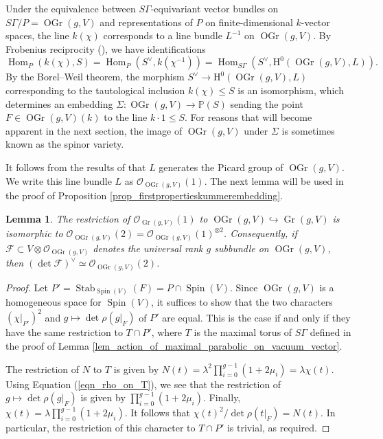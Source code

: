 \documentclass{article} %
\newtheorem{lemma}[proposition]{Lemma}
\numberwithin{equation}{section}
\DeclareMathOperator{\Spin}{Spin}
\DeclareMathOperator{\Hom}{Hom}
\DeclareMathOperator{\Stab}{Stab}
\newcommand{\sh}[1]{\mathscr{#1}}
\renewcommand{\P}{\mathbb{P}}
\renewcommand{\O}{\mathcal{O}}
\newcommand{\HH}{\mathrm{H}}
\DeclareMathOperator{\OGr}{OGr}
\DeclareMathOperator{\Gr}{Gr}
\begin{document}
Under the equivalence between $S \Gamma$-equivariant vector bundles on $S \Gamma / P = \OGr(g, V)$ and representations of $P$ on finite-dimensional $k$-vector spaces, the line $k(\chi)$ corresponds to a line bundle $L^{-1}$ on $\OGr(g, V)$. By Frobenius reciprocity (\cite[I.3.3, Proposition]{Jan03}), we have identifications
\[ \Hom_P(k(\chi), S) = \Hom_P(S^\vee, k(\chi^{-1})) = \Hom_{S \Gamma}(S^\vee, \HH^0(\OGr(g, V), L)). \]
By the Borel--Weil theorem, the morphism $S^\vee \rightarrow  \HH^0(\OGr(g, V), L)$ corresponding to the tautological inclusion $k(\chi) \leq S$ is an isomorphism, which determines an embedding $\Sigma : \OGr(g, V) \to \P(S)$ sending the point $F \in \OGr(g, V)(k)$ to the line $k \cdot 1 \leq S$. For reasons that will become apparent in the next section, the image of $\OGr(g, V)$ under $\Sigma$ is sometimes known as the spinor variety. 

It follows from the results of \cite{Pop74} that $L$ generates the Picard group of $\OGr(g,V)$.
We write this line bundle $L$ as $\mathcal{O}_{\OGr(g,V)}(1)$.
The next lemma will be used in the proof of Proposition \ref{prop_firstpropertieskummerembedding}. 
\begin{lemma}\label{lemma_spinorembedding_squareroot_plucker}
    The restriction of $\O_{\Gr(g,V)}(1)$ to $\OGr(g,V)\hookrightarrow \Gr(g,V)$ is isomorphic to $\O_{\OGr(g,V)}(2) = \O_{\OGr(g,V)}(1)^{\otimes 2}$.
    Consequently, if $\sh{F}\subset V\otimes\O_{\OGr(g,V)}$ denotes the universal rank $g$ subbundle on $\OGr(g,V)$, then $(\det \sh{F})^{\vee} \simeq \O_{\OGr(g,V)}(2)$.
\end{lemma}
\begin{proof}
    Let $P' = \Stab_{\Spin(V)}(F) = P \cap \Spin(V)$. Since $\OGr(g, V)$ is a homogeneous space for $\Spin(V)$, it suffices to show that the two characters $(\chi|_{P'})^{2}$ and $g \mapsto \det \rho(g|_F)$ of $P'$ are equal. This is the case if and only if they have the same restriction to $T \cap P'$, where $T$ is the maximal torus of $S \Gamma$ defined in the proof of Lemma \ref{lem_action_of_maximal_parabolic_on_vacuum_vector}.

    The restriction of $N$ to $T$ is given by $N(t) = \lambda^2 \prod_{i=0}^{g-1} (1 + 2 \mu_i) = \lambda \chi(t)$. Using Equation (\ref{eqn_rho_on_T}), we see that the restriction of $g \mapsto \det \rho(g|_F)$ is given by $\prod_{i=0}^{g-1} (1 + 2 \mu_i)$. Finally, $\chi(t) = \lambda \prod_{i=0}^{g-1} (1 + 2 \mu_i)$. It follows that $\chi(t)^2 / \det \rho(t|_F) = N(t)$. In particular, the restriction of this character to $T \cap P'$ is trivial, as required.
\end{proof}
\end{document}
